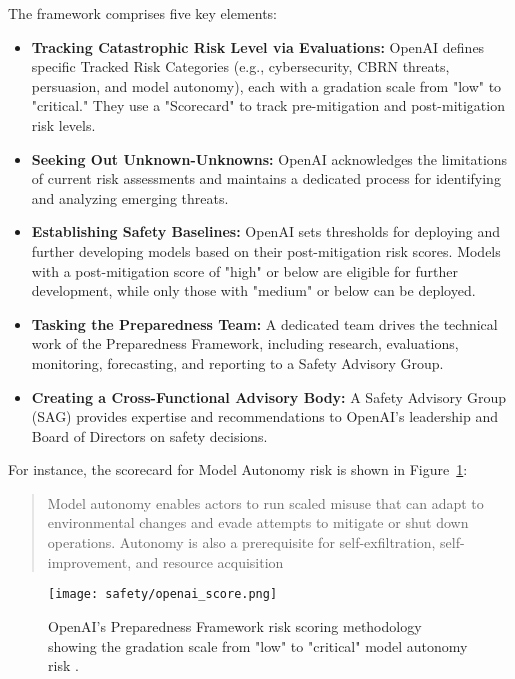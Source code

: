 The framework comprises five key elements:

\begin{itemize}
    \item \textbf{Tracking Catastrophic Risk Level via Evaluations:} OpenAI defines specific Tracked Risk Categories (e.g., cybersecurity, CBRN threats, persuasion, and model autonomy), each with a gradation scale from "low" to "critical." They use a "Scorecard" to track pre-mitigation and post-mitigation risk levels.
    \item \textbf{Seeking Out Unknown-Unknowns:} OpenAI acknowledges the limitations of current risk assessments and maintains a dedicated process for identifying and analyzing emerging threats.
    \item \textbf{Establishing Safety Baselines:} OpenAI sets thresholds for deploying and further developing models based on their post-mitigation risk scores. Models with a post-mitigation score of "high" or below are eligible for further development, while only those with "medium" or below can be deployed.  
    \item \textbf{Tasking the Preparedness Team:} A dedicated team drives the technical work of the Preparedness Framework, including research, evaluations, monitoring, forecasting, and reporting to a Safety Advisory Group. 
    \item \textbf{Creating a Cross-Functional Advisory Body:} A Safety Advisory Group (SAG) provides expertise and recommendations to OpenAI's leadership and Board of Directors on safety decisions. 
\end{itemize}

For instance, the scorecard for Model Autonomy risk is shown in Figure~\ref{openai-risk-scoring}:

\begin{quote}
Model autonomy enables actors to run scaled misuse that can adapt to environmental changes and evade attempts to mitigate or shut down operations. Autonomy is also a prerequisite for self-exfiltration, self-improvement, and resource acquisition
\end{quote}

\begin{figure}[H]
\centering
\texttt{[image: safety/openai\_score.png]}
\caption{OpenAI's Preparedness Framework risk scoring methodology showing the gradation scale from "low" to "critical" model autonomy risk \cite{openai2024preparedness}.}
\label{openai-risk-scoring}
\end{figure}

